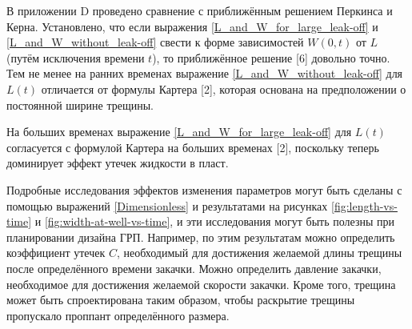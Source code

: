 \documentclass[a4paper, 12pt]{article}
\begin{document}
В приложении D проведено сравнение с приближённым решением Перкинса и Керна.
Установлено, что если выражения \eqref{L_and_W_for_large_leak-off} и \eqref{L_and_W_without_leak-off} свести к форме зависимостей $W(0,t)$ от $L$ (путём исключения времени $t$), то приближённое решение [6] довольно точно.
Тем не менее на ранних временах выражение \eqref{L_and_W_without_leak-off} для $L(t)$ отличается от формулы Картера [2], которая основана на предположении о постоянной ширине трещины.

На больших временах выражение \eqref{L_and_W_for_large_leak-off} для $L(t)$ согласуется с формулой Картера на больших временах [2], поскольку теперь доминирует эффект утечек жидкости в пласт.

Подробные исследования эффектов изменения параметров могут быть сделаны с помощью выражений \eqref{Dimensionless} и результатами на рисунках \ref{fig:length-vs-time} и \ref{fig:width-at-well-vs-time}, и эти исследования могут быть полезны при планировании дизайна ГРП.
Например, по этим результатам можно определить коэффициент утечек $C$, необходимый для достижения желаемой длины трещины после определённого времени закачки.
Можно определить давление закачки, необходимое для достижения желаемой скорости закачки.
Кроме того, трещина может быть спроектирована таким образом, чтобы раскрытие трещины пропускало проппант определённого размера.
\end{document}
